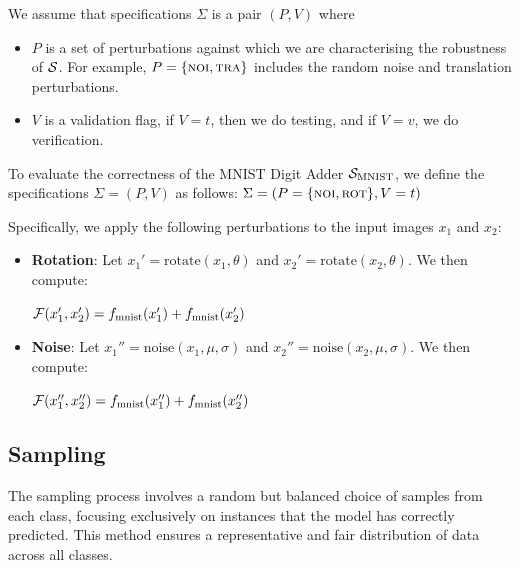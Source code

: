 \documentclass[10pt, conference, a4paper, final]{IEEEtran}
\begin{document}
We assume that specifications $\Sigma$ is a pair $(P, V)$ where
\begin{itemize}
\item $P$ is a set of perturbations against which we are characterising the robustness of $\S$. For example, $P = \{\noise,\translation\}$ includes the random noise and translation perturbations.

\item $V$ is a validation flag, if $V=t$, then we do testing, and if $V=v$, we do verification.
\end{itemize}


\begin{example}
    To evaluate the correctness of the MNIST Digit Adder $\S_{\text{MNIST}}$, we define the specifications $\Sigma = (P, V)$ as follows:
    $\Sigma = (P = \{\noise,\rotation\},  V=t)$
  
    Specifically, we apply the following perturbations to the input images $x_1$ and $x_2$:
    \begin{itemize}
     
        \item \textbf{Rotation}: Let $x_1' = \text{rotate}(x_1, \theta)$ and $x_2' = \text{rotate}(x_2, \theta)$. We then compute:
       
        $\F(x_1', x_2') = f_{\text{mnist}}(x_1') + f_{\text{mnist}}(x_2')$

        \item \textbf{Noise}: Let $x_1'' = \text{noise}(x_1, \mu, \sigma)$ and $x_2'' = \text{noise}(x_2, \mu, \sigma)$. We then compute:
        
        $\F(x_1'', x_2'') = f_{\text{mnist}}(x_1'') + f_{\text{mnist}}(x_2'')$

    \end{itemize}
  
  \end{example}
  

\subsection{Sampling}
The sampling process involves a random but balanced choice of samples from each class, focusing exclusively on instances that the model has correctly predicted. This method ensures a representative and fair distribution of data across all classes. 
\end{document}
